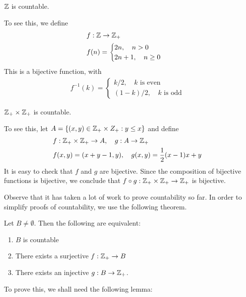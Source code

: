 \begin{claim}
	$\mathbb{Z}$ is countable.
\end{claim}
To see this, we define 
\begin{equation*}
\begin{split}
	& f: \mathbb{Z} \to \mathbb{Z}_{+}
	\\
	& f(n) = \begin{cases}
	2n, \quad n > 0 \\
	2n+1, \quad n \ge 0
	\end{cases}
\end{split}
\end{equation*}
This is a bijective function, with 
\begin{equation*}
\begin{split}
	f^{-1}(k) = 
	\begin{cases}
		k/2, \quad k \text{ is even} \\
		(1-k)/2, \quad k \text{ is odd}
	\end{cases}
\end{split}
\end{equation*}
\begin{claim}
	$\mathbb{Z}_{+} \times \mathbb{Z}_{+}$ is countable.		 
\end{claim}
To see this, let $A = \left\{(x,y) \in \mathbb{Z}_{+} \times Z_{+}: y \le x\right\}$
and define
\begin{equation*}
\begin{split}
	& f: \mathbb{Z}_{+} \times \mathbb{Z}_{+} \to A, \quad g: A \to \mathbb{Z}_{+} \\
	& f(x,y) = (x + y-1, y), \quad g(x,y) = \frac{1}{2}(x-1)x + y		
\end{split}
\end{equation*}
It is easy to check that $f$ and $g$ are bijective. Since the composition of
bijective functions is bijective, we conclude that $f \circ g: \mathbb{Z}_{+} \times
\mathbb{Z}_{+} \to \mathbb{Z}_{+}$ is bijective.

Observe that it has taken a lot of work to prove countability so far. 
In order to simplify proofs of countability, we use the following theorem.
\begin{theorem}\label{thm:proof-countability}
	Let $B \neq \emptyset$. Then the following are equivalent:
	\begin{enumerate}
		\item \label{it:1} $B$ is countable
		\item \label{it:2} There exists a surjective $f: \mathbb{Z}_{+} \to B$
		\item \label{it:3} There exists an injective $g: B \to \mathbb{Z}_{+}$. 
	\end{enumerate}
\end{theorem}
To prove this, we shall need the following lemma:

